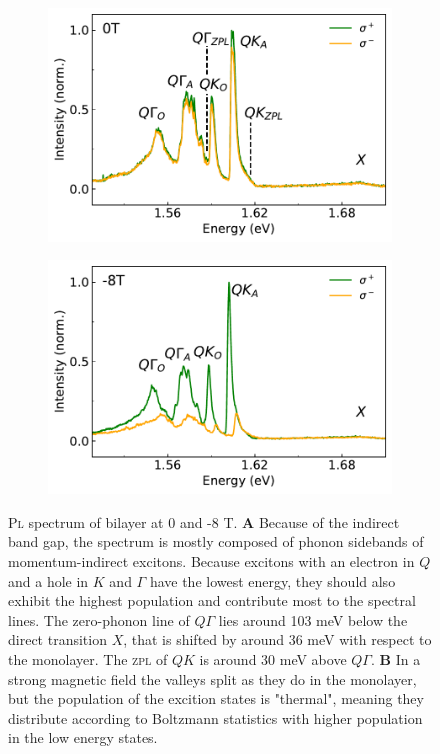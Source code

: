 \begin{figure}[t]
	\begin{subfigure}{0.49\textwidth}
		\caption{}
		\includegraphics[height=0.65\textwidth]{bilayer_0T}
	\end{subfigure}
	\begin{subfigure}{0.49\textwidth}
		\caption{}
		\includegraphics[height=0.65\textwidth]{bilayer_-8T}
	\end{subfigure}
	\caption{\textsc{Pl} spectrum of bilayer \wse at 0 and -8 T. \textbf{A} Because of the indirect band gap, the \pl spectrum is mostly composed of phonon sidebands of momentum-indirect excitons. Because excitons with an electron in $Q$ and a hole in $K$ and $\Gamma$ have the lowest energy, they should also exhibit the highest population and contribute most to the spectral lines. The zero-phonon line of $Q\Gamma$ lies around 103 meV below the direct transition $X$, that is shifted by around 36 meV with respect to the monolayer. The \textsc{zpl} of $QK$ is around 30 meV above $Q\Gamma$. \textbf{B} In a strong magnetic field the valleys split as they do in the monolayer, but the population of the excition states is "thermal", meaning they distribute according to Boltzmann statistics with higher population in the low energy states.} 
	\label{bilayerthermal}
\end{figure}

